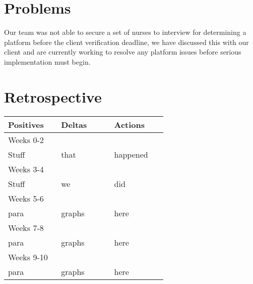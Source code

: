 \documentclass[onecolumn, draftclsnofoot,10pt, compsoc]{IEEEtran}
\begin{document}
\section{Problems}
Our team was not able to secure a set of nurses to interview for determining a platform before the client verification deadline, we have discussed this with our client and are currently working to resolve any platform issues before serious implementation must begin.
\section{Retrospective}
\begin{tabular}{p{0.3\linewidth} p{0.3\linewidth} p{0.3\linewidth}}
\large{Positives} & \large{Deltas} & \large{Actions}\\
\hline
Weeks 0-2 & \nobreakspace & \nobreakspace\\
\hline
Stuff & that & happened\\
\hline
Weeks 3-4 \nobreakspace & \nobreakspace\\
\hline
Stuff & we & did\\
\hline
Weeks 5-6 \nobreakspace & \nobreakspace\\
\hline
para & graphs & here\\
\hline
Weeks 7-8 \nobreakspace & \nobreakspace\\
\hline
para & graphs & here\\
\hline
Weeks 9-10 \nobreakspace & \nobreakspace\\
\hline
para & graphs & here\\
\hline


\end{tabular}
\end{document}

